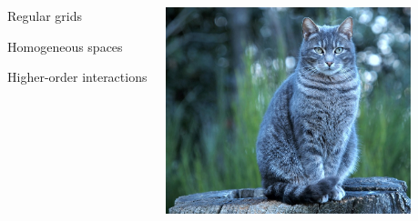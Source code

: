 \documentclass[landscape,a0paper,blockverticalspace = 7mm]{tikzposter}
\begin{document}
\begin{columns}
{{\begin{center}
\begin{minipage}{0.2\linewidth}
		\begin{center}
		Regular grids
	\end{center}		       
      \end{minipage}
      \begin{minipage}{0.1\linewidth}
         \begin{center}	   
	\end{center}
      \end{minipage} 
	\begin{minipage}{0.2\linewidth}
         \begin{center}
		Homogeneous spaces
	\end{center}
      \end{minipage}    
      \begin{minipage}{0.1\linewidth}
         \begin{center}	   
	\end{center}
      \end{minipage} 
	\begin{minipage}{0.2\linewidth}
         \begin{center}
		Higher-order interactions
	\end{center}
      \end{minipage}
      
       \end{center}  
       
       
\begin{center}
		 \begin{minipage}{0.2\linewidth}
		 \begin{center}
		
          \includegraphics[height=6cm]{figures/cat.jpg}
          \vspace{0.5cm}

          \end{center}
      \end{minipage} 
      \begin{minipage}{0.1\linewidth}
      \begin{center}
      

\end{center}
\end{minipage}
\end{center}}}
\end{columns}
\end{document}
